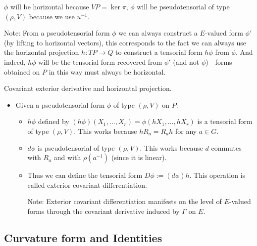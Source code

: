\documentclass{report}
\theoremstyle{definition}
\begin{document}
\begin{itemize}
\begin{itemize}
        $\phi$ will be horizontal because $VP=\ker\pi$, $\phi$ will be pseudotensorial of type $(\rho,V)$ because we use $u^{-1}$.

        Note: From a pseudotensorial form $\phi$ we can always construct a $E$-valued form $\phi'$ (by lifting to horizontal vectors), this corresponds to the fact we can always use the horizontal projection $h:TP\to Q$ to construct a tensorial form $h\phi$ from $\phi$. And indeed, $h\phi$ will be the tensorial form recovered from $\phi'$ (and not $\phi$) - forms obtained on $P$ in this way must always be horizontal.
    \end{itemize}
\end{itemize}

Covariant exterior derivative and horizontal projection.
\begin{itemize}
    \item Given a pseudotensorial form $\phi$ of type $(\rho,V)$ on $P$:
    \begin{itemize}
        \item $h\phi$ defined by $(h\phi)(X_1,...,X_r)=\phi(hX_1,...,hX_r)$ is a  tensorial form of type $(\rho,V)$. This works because $hR_a=R_ah$ for any $a\in G$.
        \item $d\phi$ is pseudotensorial of type $(\rho,V)$. This works because $d$ commutes with $R_a$ and with $\rho(a^{-1})$ (since it is linear).
        \item Thus we can define the tensorial form $D\phi:=(d\phi)h$. This operation is called exterior covariant differentiation.

        Note: Exterior covariant differentiation manifests on the level of $E$-valued forms through the covariant derivative induced by $\Gamma$ on $E$.
    \end{itemize}
\end{itemize}

\subsection{Curvature form and Identities}
\end{document}

